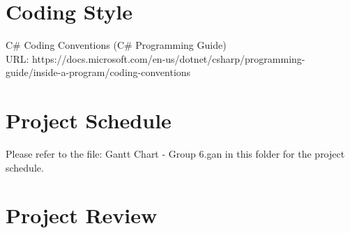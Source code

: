 \documentclass{article}
\begin{document}
\section{Coding Style}
C\# Coding Conventions (C\# Programming Guide)\\
URL: https://docs.microsoft.com/en-us/dotnet/csharp/programming-guide/inside-a-program/coding-conventions

\section{Project Schedule}

Please refer to the file: Gantt Chart - Group 6.gan in this folder for the project schedule.

\section{Project Review}
\end{document}

